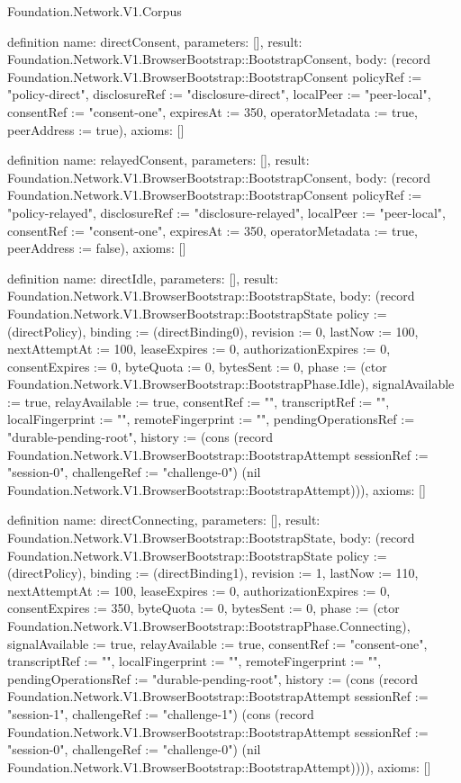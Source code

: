 \begin{lexlean}{Foundation.Network.V1.Corpus}
\begin{semanticmodule}
definition{
  name: directConsent,
  parameters: [],
  result: Foundation.Network.V1.BrowserBootstrap::BootstrapConsent,
  body: (record Foundation.Network.V1.BrowserBootstrap::BootstrapConsent {policyRef := "policy-direct", disclosureRef := "disclosure-direct", localPeer := "peer-local", consentRef := "consent-one", expiresAt := 350, operatorMetadata := true, peerAddress := true}),
  axioms: []
}

definition{
  name: relayedConsent,
  parameters: [],
  result: Foundation.Network.V1.BrowserBootstrap::BootstrapConsent,
  body: (record Foundation.Network.V1.BrowserBootstrap::BootstrapConsent {policyRef := "policy-relayed", disclosureRef := "disclosure-relayed", localPeer := "peer-local", consentRef := "consent-one", expiresAt := 350, operatorMetadata := true, peerAddress := false}),
  axioms: []
}

definition{
  name: directIdle,
  parameters: [],
  result: Foundation.Network.V1.BrowserBootstrap::BootstrapState,
  body: (record Foundation.Network.V1.BrowserBootstrap::BootstrapState {policy := (directPolicy), binding := (directBinding0), revision := 0, lastNow := 100, nextAttemptAt := 100, leaseExpires := 0, authorizationExpires := 0, consentExpires := 0, byteQuota := 0, bytesSent := 0, phase := (ctor Foundation.Network.V1.BrowserBootstrap::BootstrapPhase.Idle), signalAvailable := true, relayAvailable := true, consentRef := "", transcriptRef := "", localFingerprint := "", remoteFingerprint := "", pendingOperationsRef := "durable-pending-root", history := (cons (record Foundation.Network.V1.BrowserBootstrap::BootstrapAttempt {sessionRef := "session-0", challengeRef := "challenge-0"}) (nil Foundation.Network.V1.BrowserBootstrap::BootstrapAttempt))}),
  axioms: []
}

definition{
  name: directConnecting,
  parameters: [],
  result: Foundation.Network.V1.BrowserBootstrap::BootstrapState,
  body: (record Foundation.Network.V1.BrowserBootstrap::BootstrapState {policy := (directPolicy), binding := (directBinding1), revision := 1, lastNow := 110, nextAttemptAt := 100, leaseExpires := 0, authorizationExpires := 0, consentExpires := 350, byteQuota := 0, bytesSent := 0, phase := (ctor Foundation.Network.V1.BrowserBootstrap::BootstrapPhase.Connecting), signalAvailable := true, relayAvailable := true, consentRef := "consent-one", transcriptRef := "", localFingerprint := "", remoteFingerprint := "", pendingOperationsRef := "durable-pending-root", history := (cons (record Foundation.Network.V1.BrowserBootstrap::BootstrapAttempt {sessionRef := "session-1", challengeRef := "challenge-1"}) (cons (record Foundation.Network.V1.BrowserBootstrap::BootstrapAttempt {sessionRef := "session-0", challengeRef := "challenge-0"}) (nil Foundation.Network.V1.BrowserBootstrap::BootstrapAttempt)))}),
  axioms: []
}


\end{semanticmodule}
\end{lexlean}
